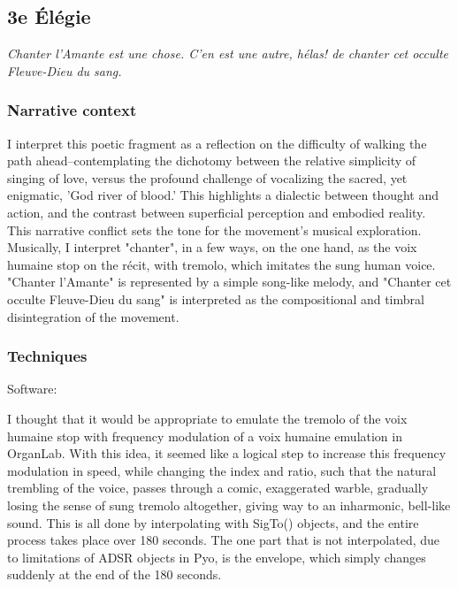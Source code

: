\documentclass[12pt,twoside,maitrise]{dms}
\theoremstyle{definition}
\begin{document}
\subsection{3e Élégie}

\epigraph{\textit{Chanter l'Amante est une chose. C'en est une autre, hélas! de chanter cet occulte Fleuve-Dieu du sang.}}{}

\subsubsection{Narrative context}

I interpret this poetic fragment as a reflection on the difficulty of walking the path ahead--contemplating the dichotomy between the relative simplicity of singing of love, versus the profound challenge of vocalizing the sacred, yet enigmatic, 'God river of blood.' 
This highlights a dialectic between thought and action, and the contrast between superficial perception and embodied reality.
This narrative conflict sets the tone for the movement's musical exploration.
Musically, I interpret "chanter", in a few ways, on the one hand, as the voix humaine stop on the récit, with tremolo, which imitates the sung human voice.
"Chanter l'Amante" is represented by a simple song-like melody, and "Chanter cet occulte Fleuve-Dieu du sang" is interpreted as the compositional and timbral disintegration of the movement.

\subsubsection{Techniques}

Software:

I thought that it would be appropriate to emulate the tremolo of the voix humaine stop with frequency modulation of a voix humaine emulation in OrganLab.
With this idea, it seemed like a logical step to increase this frequency modulation in speed, while changing the index and ratio, such that the natural trembling of the voice, passes through a comic, exaggerated warble, gradually losing the sense of sung tremolo altogether, giving way to an inharmonic, bell-like sound.
This is all done by interpolating with SigTo() objects, and the entire process takes place over 180 seconds.
The one part that is not interpolated, due to limitations of ADSR objects in Pyo, is the envelope, which simply changes suddenly at the end of the 180 seconds.
\end{document}
